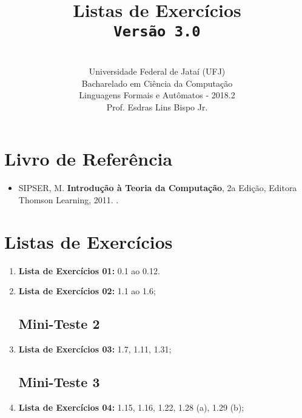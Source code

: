 \documentclass[12pt,a4paper,oneside]{article}
\author{\\Universidade Federal de Jataí (UFJ)\\Bacharelado em Ciência da Computação \\Linguagens Formais e Autômatos - 2018.2 \\Prof. Esdras Lins Bispo Jr.}
\date{}
\title{
	\sc \huge Listas de Exercícios
	\\{\tt Versão 3.0}
}
\begin{document}
\maketitle

\section{Livro de Referência}
	\begin{itemize}
		\item SIPSER, M. {\bf Introdução à Teoria da Computação}, 2a Edição, Editora Thomson Learning, 2011. \color{blue}{\bf Código Bib.: [004 SIP/int]}.
	\end{itemize}
	
\section{Listas de Exercícios}

\begin{enumerate}

	\subsection{Mini-Teste 1}
	\item[] {\bf Lista de Exercícios 01:} 0.1 ao 0.12.
	\item[] {\bf Lista de Exercícios 02:} 1.1 ao 1.6;
	
	\subsection{Mini-Teste 2}
	\item[] {\bf Lista de Exercícios 03:} 1.7, 1.11, 1.31;
	
	\subsection{Mini-Teste 3}
	\item[] {\bf Lista de Exercícios 04:} 1.15, 1.16, 1.22, 1.28 (a), 1.29 (b);
	
	
\end{enumerate}
\end{document}
